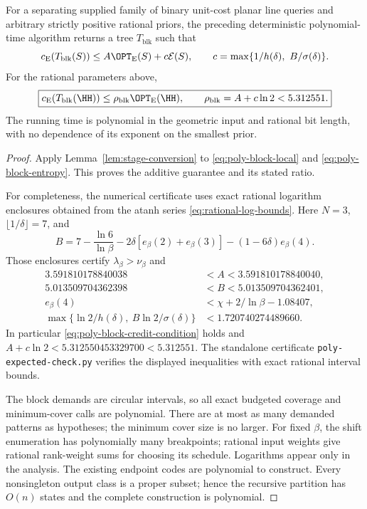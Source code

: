 \begin{theorem}
\label{thm:poly-block-expected}
For a separating supplied family of binary unit-cost planar line queries
and arbitrary strictly positive rational priors, the preceding
deterministic polynomial-time algorithm returns a tree $T_{\mathrm{blk}}$
such that
\[
 c_{\mathrm E}(T_{\mathrm{blk}}(S))
 \le A\OPT_{\mathrm E}(S)+c\mathcal E(S),\qquad
 c=\max\{1/h(\delta),\ B/\sigma(\delta)\}.
\]
For the rational parameters above,
\begin{equation}\label{eq:poly-block-factor}
 \boxed{c_{\mathrm E}(T_{\mathrm{blk}}(\HH))
 \le\rho_{\mathrm{blk}}\OPT_{\mathrm E}(\HH),\qquad
 \rho_{\mathrm{blk}}=A+c\ln2<5.312551.}
\end{equation}
The running time is polynomial in the geometric input and rational bit
length, with no dependence of its exponent on the smallest prior.
\end{theorem}
\begin{proof}
Apply Lemma~\ref{lem:stage-conversion} to
\eqref{eq:poly-block-local} and \eqref{eq:poly-block-entropy}.
This proves the additive guarantee and its stated ratio.

For completeness, the numerical certificate uses exact rational
logarithm enclosures obtained from the atanh series
\eqref{eq:rational-log-bounds}. Here $N=3$, $\lfloor1/\delta\rfloor=7$,
and
\[
 B=7-\frac{\ln6}{\ln\beta}
       -2\delta[e_\beta(2)+e_\beta(3)]
       -(1-6\delta)e_\beta(4).
\]
Those enclosures certify $\lambda_\beta>\nu_\beta$ and
\[
 \begin{aligned}
 3.591810178840038&<A<3.591810178840040,\\
 5.013509704362398&<B<5.013509704362401,\\
 e_\beta(4)&<\chi+2/\ln\beta-1.08407,\\
 \max\{\ln2/h(\delta),\ B\ln2/\sigma(\delta)\}
 &<1.720740274489660.
 \end{aligned}
\]
In particular \eqref{eq:poly-block-credit-condition} holds and
$A+c\ln2<5.312550453329700<5.312551$.
The standalone certificate \texttt{poly-expected-check.py} verifies
the displayed inequalities with exact rational interval bounds.

The block demands are circular intervals, so all exact budgeted
coverage and minimum-cover calls are polynomial. There are at most
as many demanded patterns as hypotheses; the minimum cover size is
no larger. For fixed $\beta$, the shift enumeration has polynomially
many breakpoints; rational input weights give rational rank-weight sums
for choosing its schedule.
Logarithms appear only in the analysis. The existing endpoint codes
are polynomial to construct. Every nonsingleton output class is a
proper subset; hence the recursive partition has $O(n)$ states and
the complete construction is polynomial.
\end{proof}

